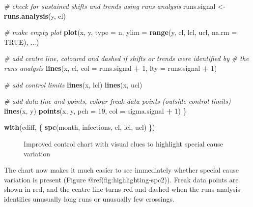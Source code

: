 \documentclass[
]{book}
\makeatletter
\newenvironment{Shaded}{\begin{snugshade}}{\end{snugshade}}
\newcommand{\AttributeTok}[1]{\textcolor[rgb]{0.13,0.29,0.53}{#1}}
\newcommand{\CommentTok}[1]{\textcolor[rgb]{0.56,0.35,0.01}{\textit{#1}}}
\newcommand{\ConstantTok}[1]{\textcolor[rgb]{0.56,0.35,0.01}{#1}}
\newcommand{\DecValTok}[1]{\textcolor[rgb]{0.00,0.00,0.81}{#1}}
\newcommand{\FunctionTok}[1]{\textcolor[rgb]{0.13,0.29,0.53}{\textbf{#1}}}
\newcommand{\NormalTok}[1]{#1}
\newcommand{\OtherTok}[1]{\textcolor[rgb]{0.56,0.35,0.01}{#1}}
\newcommand{\SpecialCharTok}[1]{\textcolor[rgb]{0.81,0.36,0.00}{\textbf{#1}}}
\newcommand{\StringTok}[1]{\textcolor[rgb]{0.31,0.60,0.02}{#1}}
\newcommand*\pandocbounded[1]{%
  \sbox\pandoc@box{#1}%
  \Gscale@div\@tempa{\textheight}{\dimexpr\ht\pandoc@box+\dp\pandoc@box\relax}%
  \Gscale@div\@tempb{\linewidth}{\wd\pandoc@box}%
  \ifdim\@tempb\p@<\@tempa\p@\let\@tempa\@tempb\fi%
  \ifdim\@tempa\p@<\p@\scalebox{\@tempa}{\usebox\pandoc@box}%
  \else\usebox{\pandoc@box}%
  \fi%
}
\makeatother
\begin{document}
\begin{Shaded}
\begin{Highlighting}[numbers=left,,]
  \CommentTok{\# check for sustained shifts and trends using runs analysis}
\NormalTok{  runs.signal }\OtherTok{\textless{}{-}} \FunctionTok{runs.analysis}\NormalTok{(y, cl)}
  
  \CommentTok{\# make empty plot}
  \FunctionTok{plot}\NormalTok{(x, y, }
       \AttributeTok{type =} \StringTok{\textquotesingle{}n\textquotesingle{}}\NormalTok{,}
       \AttributeTok{ylim =} \FunctionTok{range}\NormalTok{(y, cl, lcl, ucl, }\AttributeTok{na.rm =} \ConstantTok{TRUE}\NormalTok{),}
\NormalTok{       ...)}
  
  \CommentTok{\# add centre line, coloured and dashed if shifts or trends were identified by}
  \CommentTok{\# the runs analysis}
  \FunctionTok{lines}\NormalTok{(x, cl,}
        \AttributeTok{col =}\NormalTok{ runs.signal }\SpecialCharTok{+} \DecValTok{1}\NormalTok{,}
        \AttributeTok{lty =}\NormalTok{ runs.signal }\SpecialCharTok{+} \DecValTok{1}\NormalTok{)}
  
  \CommentTok{\# add control limits}
  \FunctionTok{lines}\NormalTok{(x, lcl)}
  \FunctionTok{lines}\NormalTok{(x, ucl)}
  
  \CommentTok{\# add data line and points, colour freak data points (outside control limits)}
  \FunctionTok{lines}\NormalTok{(x, y)}
  \FunctionTok{points}\NormalTok{(x, y,}
         \AttributeTok{pch =} \DecValTok{19}\NormalTok{,}
         \AttributeTok{col =}\NormalTok{ sigma.signal }\SpecialCharTok{+} \DecValTok{1}\NormalTok{)}
\NormalTok{\}}
\end{Highlighting}
\end{Shaded}

\begin{Shaded}
\begin{Highlighting}[]
\FunctionTok{with}\NormalTok{(cdiff, \{}
  \FunctionTok{spc}\NormalTok{(month, infections, cl, lcl, ucl)}
\NormalTok{\})}
\end{Highlighting}
\end{Shaded}

\begin{figure}
\centering
\pandocbounded{}
\caption{Improved control chart with visual clues to highlight special
cause variation}
\end{figure}

The chart now makes it much easier to see immediately whether special
cause variation is present (Figure @ref(fig:highlighting-spc2)). Freak
data points are shown in red, and the centre line turns red and dashed
when the runs analysis identifies unusually long runs or unusually few
crossings.
\end{document}
